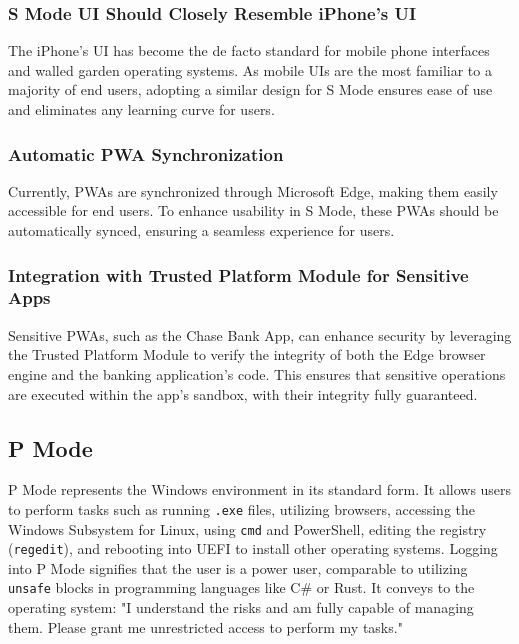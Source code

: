 \subsubsection{S Mode UI Should Closely Resemble iPhone's UI}

The iPhone's UI has become the de facto standard for mobile phone interfaces and walled garden operating systems. As mobile UIs are the most familiar to a majority of end users, adopting a similar design for S Mode ensures ease of use and eliminates any learning curve for users. 

\subsubsection{Automatic PWA Synchronization}

Currently, PWAs are synchronized through Microsoft Edge, making them easily accessible for end users. To enhance usability in S Mode, these PWAs should be automatically synced, ensuring a seamless experience for users.

\subsubsection{Integration with Trusted Platform Module for Sensitive Apps}

Sensitive PWAs, such as the Chase Bank App, can enhance security by leveraging the Trusted Platform Module\cite{10.1145/3320269.3372197} to verify the integrity of both the Edge browser engine and the banking application's code. This ensures that sensitive operations are executed within the app's sandbox, with their integrity fully guaranteed.

\subsection{P Mode}

P Mode represents the Windows environment in its standard form. It allows users to perform tasks such as running \texttt{.exe} files, utilizing browsers, accessing the Windows Subsystem for Linux, using \texttt{cmd} and PowerShell, editing the registry (\texttt{regedit}), and rebooting into UEFI to install other operating systems. Logging into P Mode signifies that the user is a power user, comparable to utilizing \texttt{unsafe} blocks in programming languages like C\# or Rust. It conveys to the operating system: "I understand the risks and am fully capable of managing them. Please grant me unrestricted access to perform my tasks."

